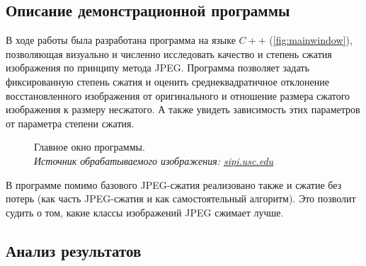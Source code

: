\documentclass[12pt,a4paper]{article}
\begin{document}
        \subsection{Описание демонстрационной программы}

            В ходе работы была разработана программа на языке $C++$ (\autoref{fig:mainwindow}), позволяющая визуально и численно исследовать качество и степень сжатия изображения по принципу метода JPEG. Программа позволяет задать фиксированную степень сжатия и оценить среднеквадратичное отклонение восстановленного изображения от оригинального и отношение размера сжатого изображения к размеру несжатого. А также увидеть зависимость этих параметров от параметра степени сжатия.
            \begin{figure}[!htb]%
                \centering
                \hspace{8pt}%
                \caption[]{Главное окно программы. \\\textit{Источник обрабатываемого изображения: \url{sipi.usc.edu}}}%
                \label{fig:mainwindow}%
            \end{figure}

            В программе помимо базового JPEG-сжатия реализовано также и сжатие без потерь (как часть JPEG-сжатия и как самостоятельный алгоритм). Это позволит судить о том, какие классы изображений JPEG сжимает лучше.


        \subsection{Анализ результатов}
\end{document}
